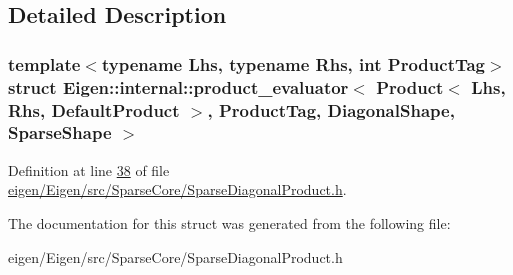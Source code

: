 \subsection{Detailed Description}
\subsubsection*{template$<$typename Lhs, typename Rhs, int Product\+Tag$>$\newline
struct Eigen\+::internal\+::product\+\_\+evaluator$<$ Product$<$ Lhs, Rhs, Default\+Product $>$, Product\+Tag, Diagonal\+Shape, Sparse\+Shape $>$}



Definition at line \hyperlink{eigen_2_eigen_2src_2_sparse_core_2_sparse_diagonal_product_8h_source_l00038}{38} of file \hyperlink{eigen_2_eigen_2src_2_sparse_core_2_sparse_diagonal_product_8h_source}{eigen/\+Eigen/src/\+Sparse\+Core/\+Sparse\+Diagonal\+Product.\+h}.



The documentation for this struct was generated from the following file\+:\begin{DoxyCompactItemize}
\item 
eigen/\+Eigen/src/\+Sparse\+Core/\+Sparse\+Diagonal\+Product.\+h\end{DoxyCompactItemize}
